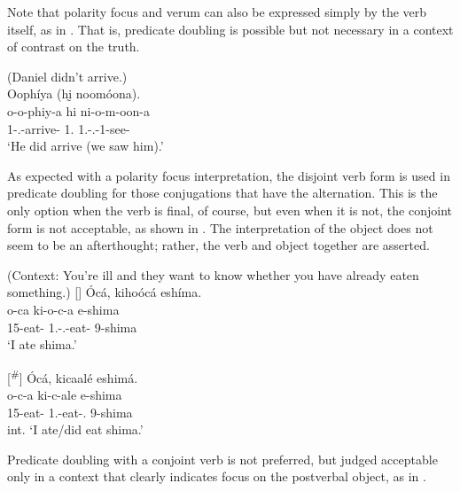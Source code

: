 \documentclass[output=paper]{langscibook}
\begin{document}
Note that polarity focus and verum can also be expressed simply by the verb itself, as in . That is, predicate doubling is possible but not necessary in a context of contrast on the truth.

\ea
\label{bkm:Ref96768886}
(Daniel didn’t arrive.)\\
Oophíya (hḭ noomóona).\\
\gll
o-o-phiy-a  hi  ni-o-m-oon-a\\
1\SM{}-\PFV{}.\DJ{}-arrive-\FV{}  1\PL{}.\PRO{}  1\PL{}.\SM{}-\PFV{}.\DJ{}-1\OM{}-see-\FV{}\\
\glt
‘He did arrive (we saw him).’\\


\z

As expected with a polarity focus interpretation, the disjoint verb form is used in predicate doubling for those conjugations that have the alternation. This is the only option when the verb is final, of course, but even when it is not, the conjoint form is not acceptable, as shown in . The interpretation of the object does not seem to be an afterthought; rather, the verb and object together are asserted.

\ea
\label{bkm:Ref95391935}(Context: You’re ill and they want to know whether you have already eaten something.)
\ea
[]{
Ócá, kihoócá eshíma.\\
\gll
o-ca  ki-o-c-a  e-shima\\
15-eat-\FV{}  1\SG{}.\SM{}-\PFV{}.\DJ{}-eat-\FV{}  9-shima\\
\glt
‘I ate shima.’\\
}

\ex
[\textsuperscript{\#}]{
Ócá, kicaalé eshimá.\\
\gll
o-c-a  ki-c-ale  e-shima\\
15-eat-\FV{}  1\SG{}.\SM{}-eat-\PFV{}.\CJ{}  9-shima\\
\glt
int. ‘I ate/did eat shima.’\\
}

\z
\z

Predicate doubling with a conjoint verb is not preferred, but judged acceptable only in a context that clearly indicates focus on the postverbal object, as in .
\end{document}
